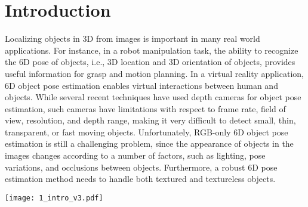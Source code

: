 \documentclass[twocolumn]{svjour3}
\newcommand{\dimnet}[0]{DeepIM}
\begin{document}
\section{Introduction}

Localizing objects in 3D from images is important in many real world applications. For instance, in a robot manipulation task, the ability to recognize the 6D pose of objects, i.e., 3D location and 3D orientation of objects, provides useful information for grasp and motion planning. In a virtual reality application, 6D object pose estimation enables virtual interactions between human and objects. While several recent techniques have used depth cameras
for object pose estimation, such cameras have limitations with respect to frame rate, field of view, resolution, and depth range, making it very difficult to detect small, thin, transparent, or fast moving objects. Unfortunately, RGB-only 6D object pose estimation is still a challenging problem, since the appearance of objects in the images changes according to a number of factors, such as lighting, pose variations, and occlusions between objects. Furthermore, a robust 6D pose estimation method needs to handle both textured and textureless objects. 

\begin{figure*}[t]
	\centering
	\texttt{[image: 1\_intro\_v3.pdf]}
	\caption{We propose \dimnet, a deep iterative matching network for 6D object pose estimation. The network is trained to predict a relative SE(3) transformation that can be applied to an initial pose estimation for iterative pose refinement. Given a 6D pose estimation of an object, which can be the output of other pose estimation methods like PoseCNN~\citep{xiang2017posecnn} ($\text{pose}^{(0)}$ in the figure) or the refined pose from previous iteration ($\text{pose}^{(1)}$ in the figure), along with the 3D model of the object, we generate the rendered image showing the appearance of the target object under this rough pose estimation. With the image pairs of rendered image and observed image, the network predicts a relative transformation ($\mathrm{\Delta}\text{pose}$ in the figure) which can be applied to refine the input pose. The refined pose can be used as the input pose of next iteration and therefore the process can be repeated until the refined pose converges or the number of iterations reaches a pre-determined number.}
	\label{fig:intro}
\end{figure*}
\end{document}
